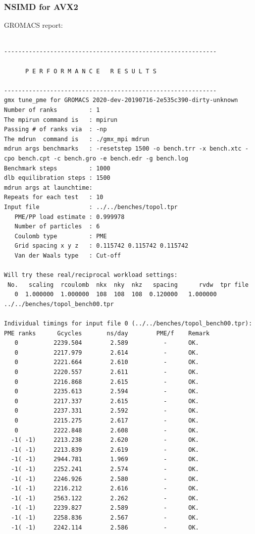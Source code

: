 \subsubsection{NSIMD for AVX2}
GROMACS report: \\
\begin{lstlisting}[frame=single]

------------------------------------------------------------

      P E R F O R M A N C E   R E S U L T S

------------------------------------------------------------
gmx tune_pme for GROMACS 2020-dev-20190716-2e535c390-dirty-unknown
Number of ranks         : 1
The mpirun command is   : mpirun
Passing # of ranks via  : -np
The mdrun  command is   : ./gmx_mpi mdrun
mdrun args benchmarks   : -resetstep 1500 -o bench.trr -x bench.xtc -cpo bench.cpt -c bench.gro -e bench.edr -g bench.log 
Benchmark steps         : 1000
dlb equilibration steps : 1500
mdrun args at launchtime: 
Repeats for each test   : 10
Input file              : ../../benches/topol.tpr
   PME/PP load estimate : 0.999978
   Number of particles  : 6
   Coulomb type         : PME
   Grid spacing x y z   : 0.115742 0.115742 0.115742
   Van der Waals type   : Cut-off

Will try these real/reciprocal workload settings:
 No.   scaling  rcoulomb  nkx  nky  nkz   spacing      rvdw  tpr file
   0  1.000000  1.000000  108  108  108  0.120000   1.000000  ../../benches/topol_bench00.tpr

Individual timings for input file 0 (../../benches/topol_bench00.tpr):
PME ranks      Gcycles       ns/day        PME/f    Remark
   0          2239.504        2.589          -      OK.
   0          2217.979        2.614          -      OK.
   0          2221.664        2.610          -      OK.
   0          2220.557        2.611          -      OK.
   0          2216.868        2.615          -      OK.
   0          2235.613        2.594          -      OK.
   0          2217.337        2.615          -      OK.
   0          2237.331        2.592          -      OK.
   0          2215.275        2.617          -      OK.
   0          2222.848        2.608          -      OK.
  -1( -1)     2213.238        2.620          -      OK.
  -1( -1)     2213.839        2.619          -      OK.
  -1( -1)     2944.781        1.969          -      OK.
  -1( -1)     2252.241        2.574          -      OK.
  -1( -1)     2246.926        2.580          -      OK.
  -1( -1)     2216.212        2.616          -      OK.
  -1( -1)     2563.122        2.262          -      OK.
  -1( -1)     2239.827        2.589          -      OK.
  -1( -1)     2258.836        2.567          -      OK.
  -1( -1)     2242.114        2.586          -      OK.


\end{lstlisting}
